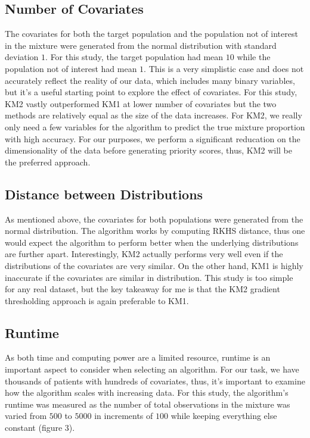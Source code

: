\documentclass[lineno]{biometrika}
\begin{document}
\subsection{Number of Covariates}
The covariates for both the target population and the population not of interest in the mixture were generated from the normal distribution with standard deviation $1$. For this study, the target population had mean $10$ while the population not of interest had mean $1$. This is a very simplistic case and does not accurately reflect the reality of our data, which includes many binary variables, but it's a useful starting point to explore the effect of covariates. For this study, KM2 vastly outperformed KM1 at lower number of covariates but the two methods are relatively equal as the size of the data increases. For KM2, we really only need a few variables for the algorithm to predict the true mixture proportion with high accuracy. For our purposes, we perform a significant reducation on the dimensionality of the data before generating priority scores, thus, KM2 will be the preferred approach.

\subsection{Distance between Distributions}
As mentioned above, the covariates for both populations were generated from the normal distribution. The algorithm works by computing RKHS distance, thus one would expect the algorithm to perform better when the underlying distributions are further apart. Interestingly, KM2 actually performs very well even if the distributions of the covariates are very similar. On the other hand, KM1 is highly inaccurate if the covariates are similar in distribution. This study is too simple for any real dataset, but the key takeaway for me is that the KM2 gradient thresholding approach is again preferable to KM1.

\subsection{Runtime}
As both time and computing power are a limited resource, runtime is an important aspect to consider when selecting an algorithm. For our task, we have thousands of patients with hundreds of covariates, thus, it's important to examine how the algorithm scales with increasing data. For this study, the algorithm's runtime was measured as the number of total observations in the mixture was varied from $500$ to $5000$ in increments of $100$ while keeping everything else constant (figure 3). 
\end{document}
